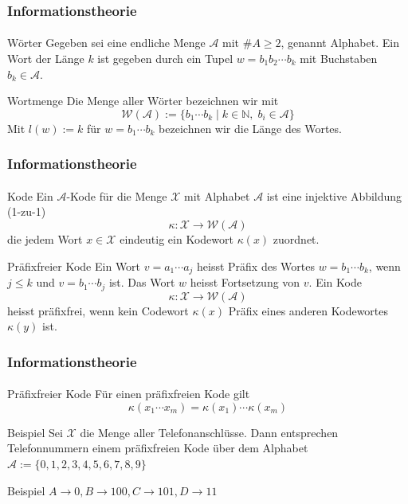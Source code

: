 \documentclass{beamer}
\begin{document}
\begin{frame}
    \frametitle{Informationstheorie}
\framesubtitle{}

\begin{block}{Wörter}
Gegeben sei eine endliche Menge $\mathcal{A}$ mit $\# A \geq 2$, genannt Alphabet.
Ein Wort der Länge $k$ ist gegeben durch ein Tupel $w = b_1b_2 \cdots b_k$ mit Buchstaben $b_k \in \mathcal {A}$.
\end{block}

\begin{block}{Wortmenge}
Die Menge aller Wörter bezeichnen wir mit 
$$\mathcal{W} (\mathcal{A}) := \{  b_1 \cdots b_k \; | \; k \in \mathbb{N}, \; b_i \in \mathcal{A} \} $$
 Mit $l(w):= k$ für $w=b_1 \cdots b_k  $ bezeichnen wir die Länge des Wortes.
\end{block}

 \end{frame}


\begin{frame}
    \frametitle{Informationstheorie}
\framesubtitle{}

\begin{block}{Kode}
Ein $\mathcal{A}$-Kode für die Menge $\mathcal{X}$ mit Alphabet $\mathcal{A}$ ist eine injektive Abbildung (1-zu-1)
$$ \kappa : \mathcal{X} \to \mathcal{W} (\mathcal{A})$$
die jedem Wort $x \in \mathcal{X}$ eindeutig ein Kodewort $\kappa(x)$ zuordnet.
\end{block}


\begin{block}{Präfixfreier Kode}
Ein Wort $v = a_1 \cdots a_j$ heisst Präfix des Wortes $w = b_1 \cdots b_k$, wenn $j \leq k$ und $v = b_1 \cdots b_j$ ist. Das Wort $w$ heisst Fortsetzung von $v$. Ein Kode $$ \kappa : \mathcal{X} \to \mathcal{W} (\mathcal{A})$$
 heisst präfixfrei, wenn kein Codewort $\kappa(x)$ Präfix eines anderen Kodewortes $\kappa(y)$ ist. 
\end{block}

 \end{frame}


\begin{frame}
    \frametitle{Informationstheorie}
\framesubtitle{}

\begin{block}{Präfixfreier Kode}
Für einen präfixfreien Kode gilt 
$$ \kappa(x_1 \cdots x_m) = \kappa(x_1) \cdots \kappa(x_m)$$
\end{block}

\begin{block}{Beispiel}
Sei $\mathcal{X}$ die Menge aller Telefonanschlüsse. Dann entsprechen Telefonnummern einem präfixfreien Kode über dem Alphabet $\mathcal{A} := \{0, 1,2,3,4,5,6,7,8,9\}$
\end{block}

\begin{block}{Beispiel}
$A \rightarrow 0, B  \rightarrow 100, C \rightarrow 101, D \rightarrow 11$ 
\end{block}

 \end{frame}
\end{document}
